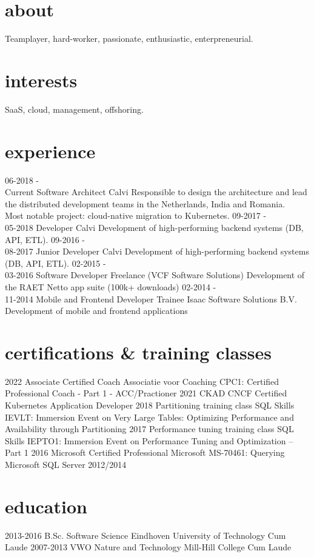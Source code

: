 \documentclass[]{friggeri-cv}
\begin{document}
\section{about}
Teamplayer, hard-worker, passionate, enthusiastic, enterpreneurial.

\section{interests}
SaaS, cloud, management, offshoring.

\section{experience}

\begin{entrylist}
  \entry
    {06-2018 -\\Current}
    {Software Architect}
    {Calvi}
    {Responsible to design the architecture and lead the distributed development teams in the Netherlands, India and Romania.\\Most notable project: cloud-native migration to Kubernetes.}
  \entry
    {09-2017 -\\05-2018}
    {Developer}
    {Calvi}
    {Development of high-performing backend systems (DB, API, ETL).}
  \entry
    {09-2016 -\\08-2017}
    {Junior Developer}
    {Calvi}
    {Development of high-performing backend systems (DB, API, ETL).}
  \entry
    {02-2015 -\\03-2016}
    {Software Developer}
    {Freelance (VCF Software Solutions)}
    {Development of the RAET Netto app suite (100k+ downloads)}
  \entry
    {02-2014 -\\11-2014}
    {Mobile and Frontend Developer Trainee}
    {Isaac Software Solutions B.V.}
    {Development of mobile and frontend applications}
\end{entrylist}

\section{certifications \& training classes}
\begin{entrylist}
  \entry
    {2022}
    {Associate Certified Coach}
    {Associatie voor Coaching}
    {CPC1: Certified Professional Coach - Part 1 - ACC/Practioner}
  \entry
    {2021}
    {CKAD}
    {CNCF}
    {Certified Kubernetes Application Developer}
  \entry
    {2018}
    {Partitioning training class}
    {SQL Skills}
    {IEVLT: Immersion Event on Very Large Tables: Optimizing Performance and Availability through Partitioning}
  \entry
    {2017}
    {Performance tuning training class}
    {SQL Skills}
    {IEPTO1: Immersion Event on Performance Tuning and Optimization – Part 1}
  \entry
    {2016}
    {Microsoft Certified Professional}
    {Microsoft}
    {MS-70461: Querying Microsoft SQL Server 2012/2014}
\end{entrylist}

\section{education}
\begin{entrylist}
  \entry
    {2013-2016}
    {B.Sc. Software Science}
    {Eindhoven University of Technology}
    {Cum Laude}
  \entry
    {2007-2013}
    {VWO Nature and Technology}
    {Mill-Hill College}
    {Cum Laude}
\end{entrylist}
\end{document}
